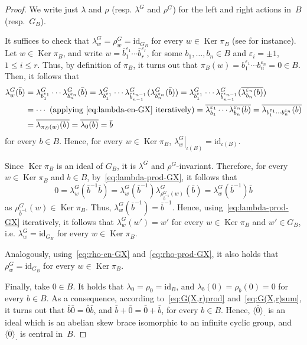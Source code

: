\documentclass[12pt, a4paper, english]{article}
\theoremstyle{definition}
\theoremstyle{remark}
\DeclareMathOperator{\Ker}{Ker}
\newcommand{\bigcdot}{\boldsymbol{\cdot}}
\begin{document}
\begin{proof}
We write just $\lambda$ and $\rho$ (resp. $\lambda^G$ and $\rho^G$) for the left and right actions in~$B$ (resp.~$G_B$).

It suffices to check that $\lambda^{G}_w = \rho^{G}_w = \mathrm{id}_{G_B}$ for every $w\in \Ker \pi_B$ (see \cite[Proposition~5.3]{BallesterEstebanPerezC24-JH} for instance). Let $w\in \Ker \pi_B$, and write $w = \bar b_1^{\varepsilon_1}\cdots \bar b_r^{\varepsilon_r}$, for some $b_1, \ldots, b_n\in B$ and $\varepsilon_i = \pm 1$, $1\leq i \leq r$. Thus, by definition of $\pi_B$, it turns out that $\pi_B(w) = b_1^{\varepsilon_1}\cdots b_n^{\varepsilon_n} = 0\in B$. Then, it follows that
\begin{align*}
 \lambda^{G}_w(\bar b) & = \lambda^{G}_{\bar b_1^{\varepsilon_1}}\cdots \lambda_{\bar b_n ^{\varepsilon_n}}^{G}(\bar b) =  \lambda_{\bar b_1^{\varepsilon_1}}^{G}\cdots \lambda_{\bar b_{n-1}^{\varepsilon_{n-1}}}^{G}(\lambda_{\bar b_n^{\varepsilon_n}}^{G}(\bar b)) =  \lambda_{\bar b_1^{\varepsilon_1}}^{G}\cdots \lambda_{\bar b_{n-1}^{\varepsilon_{n-1}}}^{G}(\overline{\lambda_{b_n}^{\varepsilon_n}(b)})\\
& = \cdots \text{ (applying~\eqref{eq:lambda-en-GX} iteratively)} = \overline{\lambda_{b_1}^{\varepsilon_1}\cdots \lambda_{b_n}^{\varepsilon_n}(b)} =  \overline{\lambda_{b_1^{\varepsilon_1}\cdots b_n^{\varepsilon_n}}(b)} \\
& = \overline{\lambda_{\pi_B(w)}(b)} = \overline{\lambda_0(b)} = \bar b
\end{align*}
for every $b\in B$. Hence, for every $w\in \Ker \pi_B$, $\left.\lambda_w^G\right|_{\iota(B)} = \mathrm{id}_{\iota(B)}$.

Since $\Ker \pi_B$ is an ideal of $G_B$, it is $\lambda^G$ and $\rho^G$-invariant. Therefore, for every $w\in \Ker \pi_B$ and $b\in B$,  by~\eqref{eq:lambda-prod-GX}, it follows that
\[ 0 = \lambda^G_w(\bar b^{-1}\bar b) = \lambda_w^G(\bar b^{-1})\lambda_{\rho^G_{\bar b^{-1}}(w)}^G(\bar b) =  \lambda_w^G(\bar b^{-1}) \bar b\]
as $\rho^G_{\bar b^{-1}}(w)\in \Ker \pi_B$. Thus, $\lambda_w^G(\bar b^{-1}) = \bar b^{-1}$. Hence, using~\eqref{eq:lambda-prod-GX} iteratively, it follows that $\lambda_w^G(w') = w'$ for every $w \in \Ker\pi_B$ and $w'\in G_B$, i.e. $\lambda_w^{G} = \mathrm{id}_{G_B}$ for every $w\in \Ker \pi_B$.

Analogously, using~\eqref{eq:rho-en-GX} and~\eqref{eq:rho-prod-GX}, it also holds that $\rho_w^G = \mathrm{id}_{G_B}$ for every $w\in \Ker \pi_B$.

Finally, take $0\in B$. It holds that $\lambda_0  = \rho_0 = \mathrm{id}_B$, and $\lambda_b(0) = \rho_b(0) = 0$ for every $b\in B$. As a consequence, according to~\eqref{eq:G(X,r)prod} and~\eqref{eq:G(X,r)sum}, it turns out that $\bar{b}\bar{0} = \bar{0}\bar{b}$, and $\bar{b} + \bar{0} = \bar 0 + \bar b$, for every $b\in B$. Hence, $\langle \bar 0 \rangle_{\bigcdot}$ is an ideal which is an abelian skew brace isomorphic to an infinite cyclic group, and $\langle \bar  0 \rangle_{\bigcdot}$ is central in~$B$.
\end{proof}
\end{document}
